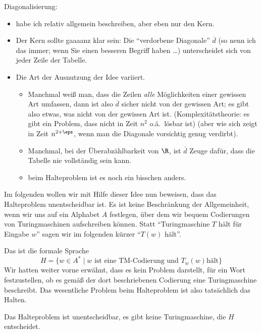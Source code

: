 \begin{tutorium}
  Diagonalisierung:
  \begin{itemize}
  \item habe ich relativ allgemein beschreiben, aber eben nur den
    Kern.
  \item Der Kern sollte gaaaanz klar sein: Die "`verdorbene
    Diagonale"' $\overline{d}$ (so nenn ich das immer; wenn Sie einen
    besseren Begriff haben \dots) unterscheidet sich von jeder Zeile
    der Tabelle.
  \item Die Art der Ausnutzung der Idee variiert.
    \begin{itemize}
    \item Manchmal weiß man, dass die Zeilen \emph{alle} Möglichkeiten
      einer gewissen Art umfassen, dann ist also $\overline{d}$ sicher
      nicht von der gewissen Art; es gibt also etwas, was nicht von
      der gewissen Art ist. (\zB Komplexitätstheorie: es gibt ein
      Problem, dass nicht in Zeit $n^2$ o.ä.\ lösbar ist) (aber wie
      sich zeigt \zB in Zeit $n^{2+\eps}$, wenn man die Diagonale
      vorsichtig genug verdirbt).
    \item Manchmal, \zB bei der Überabzählbarkeit von $\R$, ist
      $\overline{d}$ Zeuge dafür, dass die Tabelle nie vollständig
      sein kann.
    \item beim Halteproblem ist es noch ein bisschen anders.
    \end{itemize}
  \end{itemize}
\end{tutorium}
%
Im folgenden wollen wir mit Hilfe dieser Idee nun beweisen, dass das
Halteproblem unentscheidbar ist. Es ist keine Beschränkung der
Allgemeinheit, wenn wir uns auf ein Alphabet $A$ festlegen, über dem
wir bequem Codierungen von Turingmaschinen aufschreiben können. Statt
"`Turingmaschine $T$ hält für Eingabe $w$"' sagen wir im folgenden
kürzer "`$T(w)$ hält"'.

Das  ist die formale Sprache
\[
H = \{ w\in A^* \mid \text{$w$ ist eine TM-Codierung und $T_w(w)$
  hält} \}
\]
%
Wir hatten weiter vorne erwähnt, dass es kein Problem darstellt, für
ein Wort festzustellen, ob es \zB gemäß der dort beschriebenen
Codierung eine Turingmaschine beschreibt. Das wesentliche Problem beim
Halteproblem ist also tatsächlich das Halten.
%
\begin{theorem}
  Das Halteproblem ist unentscheidbar, \dh es gibt keine
  Turingmaschine, die $H$ entscheidet.
\end{theorem}


